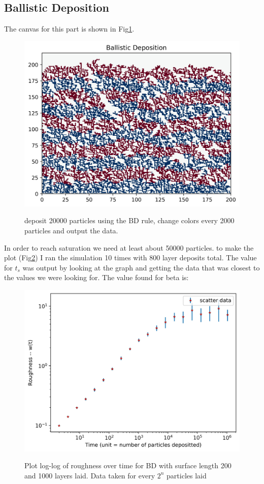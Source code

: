 \documentclass[12pt]{article}
\begin{document}
	\subsection{Ballistic Deposition}
	The canvas for this part is shown in Fig\ref{fig:BD}.
\begin{figure}[h!]
	\centering
	\includegraphics[width=.9\linewidth]{../P6/canvas.jpg}
	\label{fig:BD}
	\caption{deposit 20000 particles using the BD rule, change colors every 2000 particles and output the data.}
\end{figure}
In order to reach saturation we need
at least about 50000 particles. to make the plot (Fig\ref{fig:BDplot}) I ran the simulation 10 times with 800
layer deposits total. The value for $t_s$ was output by looking at the graph and getting
the data that was closest to the values we were looking for.
The value found for beta is:
\begin{figure}[h!]
	\includegraphics[width=0.9\linewidth]{../P6/plot_for_beta.jpg}
	\label{fig:BDplot}
	\caption{Plot log-log of roughness over time for BD with surface length 200 and 1000 layers laid. Data taken for every $2^n$ particles laid}
\end{figure}
\end{document}
